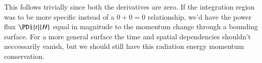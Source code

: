 This follows trivially since both the derivatives are zero.  If the integration region was to be more specific instead of a $0 + 0 = 0$ relationship, we'd have the power flux $\PDi{t}{H}$ equal in magnitude to the momentum change through a bounding surface.  For a more general surface the time and spatial dependencies shouldn't neccessarily vanish, but we should still have this radiation energy momentum conservation.


\EndArticle
